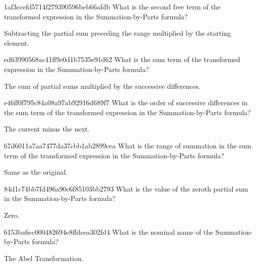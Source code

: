 \begin{note}{1af3ccefd5714f279390596beb66afdb}
    What is the second free term of the transformed expression in the Summation-by-Parts formula?

    \begin{cloze}{1}
        Subtracting the partial sum preceding the range multiplied by the starting element.
    \end{cloze}
\end{note}

\begin{note}{ed63990568ac41ff9e0d1b7535e91d62}
    What is the sum term of the transformed expression in the Summation-by-Parts formula?

    \begin{cloze}{1}
        The sum of partial sums multiplied by the successive differences.
    \end{cloze}
\end{note}

\begin{note}{e46ff0f795c84a08a97ab92916d689f7}
    What is the order of successive differences in the sum term of the transformed expression in the Summation-by-Parts formula?

    \begin{cloze}{1}
        The current minus the next.
    \end{cloze}
\end{note}

\begin{note}{67d6011a7aa7477da37cbb1ab2899cea}
    What is the range of summation in the sum term of the transformed expression in the Summation-by-Parts formula?

    \begin{cloze}{1}
        Same as the original.
    \end{cloze}
\end{note}

\begin{note}{84d1c74bb7fd496a90c6f85103bb2793}
    What is the value of the zeroth partial sum in the Summation-by-Parts formula?

    \begin{cloze}{1}
        Zero.
    \end{cloze}
\end{note}

\begin{note}{6153ba6cc000482694e8ffdcea302fd4}
    What is the nominal name of the Summation-by-Parts formula?

    \begin{cloze}{1}
        The Abel Transformation.
    \end{cloze}
\end{note}


